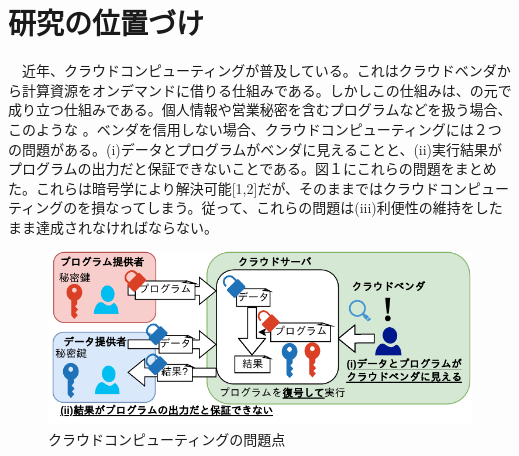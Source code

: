 
\section{研究の位置づけ}


　近年、クラウドコンピューティングが普及している。これはクラウドベンダから計算資源をオンデマンドに借りる仕組みである。しかしこの仕組みは、の元で成り立つ仕組みである。個人情報や営業秘密を含むプログラムなどを扱う場合、このような 。ベンダを信用しない場合、クラウドコンピューティングには２つの問題がある。(i)データとプログラムがベンダに見えることと、(ii)実行結果がプログラムの出力だと保証できないことである。図１にこれらの問題をまとめた。これらは暗号学により解決可能[1,2]だが、そのままではクラウドコンピューティングのを損なってしまう。従って、これらの問題は(iii)利便性の維持をしたまま達成されなければならない。
　
\begin{figure}[h]
    \centering
    \includegraphics[width=0.8\linewidth]{figures/problem.drawio.pdf}
    \vspace*{-0.5cm}
    \caption{クラウドコンピューティングの問題点}
    \label{fig:my_label}
\end{figure}

